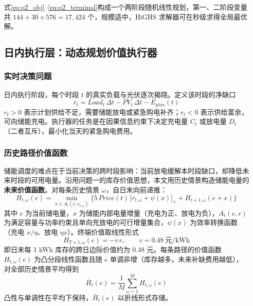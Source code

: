 \documentclass[zihao=-4,a4paper,UTF8,fontset=none]{ctexart}
\begin{document}
式\eqref{eq:q2_obj}--\eqref{eq:q2_terminal}构成一个两阶段随机线性规划，第一、二阶段变量共 $144+30\times576=17{,}424$ 个，规模适中，HiGHS 求解器可在秒级求得全局最优解。

\subsection{日内执行层：动态规划价值执行器}
\label{subsec:dp}

\subsubsection{实时决策问题}

日内执行阶段，每个时段 $t$ 的真实负载与光伏逐次揭晓。定义该时段的净缺口
\begin{equation}
  r_t = Load_t\,\Delta t - PV_t\,\Delta t - E_{plan}(t)
  \label{eq:netgap}
\end{equation}
$r_t>0$ 表示计划供给不足，需要储能放电或紧急购电补齐；$r_t<0$ 表示供给富余，可向储能充电。执行器的任务是在因果信息约束下决定充电量 $C_t$ 或放电量 $D_t$（二者互斥），最小化当天的紧急购电费用。

\subsubsection{历史路径价值函数}

储能调度的难点在于当前决策的跨时段影响：当前放电缓解本时段缺口，却降低未来时段的可用电量。沿用问题一的库存价值思想，本文用历史情景构造储能电量的\textbf{未来价值函数}。对每条历史情景 $\omega$，自日末向前递推：
\begin{equation}
  H_{t,\omega}(e) = \min_{x\in A_t(e,r_{t,\omega})}\Big\{
    5\,Price(t)\,\big[r_{t,\omega}+\psi(x)\big]_{+} + H_{t+1,\omega}(e+x)\Big\}
  \label{eq:dp_recur}
\end{equation}
其中 $e$ 为当前储电量，$x$ 为储能内部电量增量（充电为正、放电为负），$A_t(e,r)$ 为满足容量与功率约束且单向充放电的可行增量集合，$\psi(x)$ 为效率转换函数（充电 $x/\eta$、放电 $\eta x$）。终端价值取线性形式
\begin{equation}
  H_{T+1,\omega}(e) = -v\,e,\qquad v = 0.48\ \text{元/kWh}
  \label{eq:terminal_value}
\end{equation}
即日末每 1 kWh 库存的跨日边际价值约为 0.48 元。每条路径的价值函数 $H_{t,\omega}(e)$ 为凸分段线性函数且随 $e$ 单调非增（库存越多，未来补缺费用越低），对全部历史情景平均得到
\begin{equation}
  \bar{H}_t(e) = \frac{1}{M}\sum_{\omega=1}^{M} H_{t,\omega}(e)
  \label{eq:avg_value}
\end{equation}
凸性与单调性在平均下保持，$\bar{H}_t(e)$ 以折线形式存储。
\end{document}
